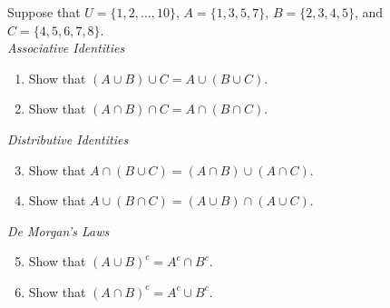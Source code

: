 Suppose that $U = \{1,2,\ldots,10\}$, $A=\{1,3,5,7\}$, $B=\{2,3,4,5\}$, and $C=\{4,5,6,7,8\}$.\\

\emph{Associative Identities}
\begin{enumerate}
\item Show that $(A \cup B) \cup C = A \cup (B \cup C)$. 

\item Show that $(A \cap B) \cap C = A \cap (B \cap C)$. 
\end{enumerate}

\emph{Distributive Identities}
\begin{enumerate}
\setcounter{enumi}{2}

\item Show that $A \cap (B \cup C) = (A \cap B) \cup (A \cap C)$. 

\item Show that $A \cup (B \cap C) = (A \cup B) \cap (A \cup C)$. 
\end{enumerate}

\emph{De Morgan's Laws}
\begin{enumerate}
\setcounter{enumi}{4}

\item Show that $(A \cup B)^c = A^c \cap B^c$. 

\item Show that $(A \cap B)^c = A^c \cup B^c$. 
\end{enumerate}